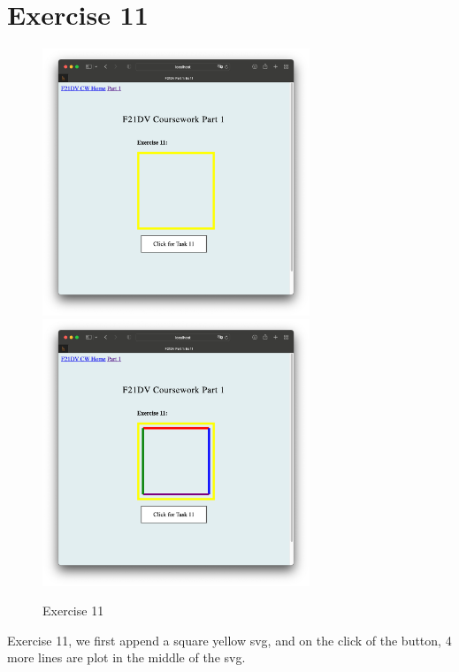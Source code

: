 \documentclass{scrreprt}
\begin{document}
\section{Exercise 11}
\begin{figure}[!ht]
    \centering
    \includegraphics[width = 8cm]{images/ex11_1.png}
    \includegraphics[width = 8cm]{images/ex11_2.png}
    \label{fig:ex11}
    \caption{Exercise 11}
\end{figure}
\FloatBarrier
% 
Exercise 11, we first append a square yellow svg, and on the click of the button, 4 more lines are plot
in the middle of the svg.

\newpage
\end{document}
